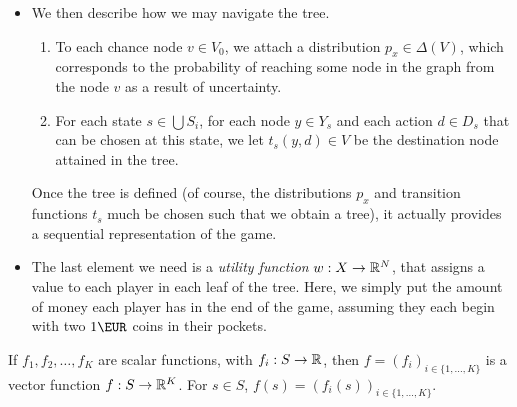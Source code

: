\begin{example}
\begin{itemize}
\item We then describe how we may navigate the tree.
\begin{enumerate}
\item To each chance node $v \in V_0$, we attach a distribution $p_x \in \Delta(V)$, which corresponds to the probability of reaching some node in the graph from the node $v$ as a result of uncertainty.
\item For each state $s \in \bigcup S_i$, for each node $y \in Y_s$ and each action $d \in D_s$ that can be chosen at this state, we let $t_s(y,d) \in V$ be the destination node attained in the tree.
\end{enumerate}
Once the tree is defined (of course, the distributions $p_x$ and transition functions $t_s$ much be chosen such that we obtain a tree), it actually provides a sequential representation of the game.
\item The last element we need is a \emph{utility function} $w : X \rightarrow \mathbb{R}^N$, that assigns a value to each player in each leaf of the tree. Here, we simply put the amount of money each player has in the end of the game, assuming they each begin with two $1\EUR$ coins in their pockets.
\end{itemize}
\end{example}





\begin{notation}
If $f_1, f_2, \ldots, f_K$ are scalar functions, with $f_i : S \rightarrow \mathbb{R}$,
then $f = (f_i)_{i \in \{1,\ldots, K\}}$ is a vector function $f : S \rightarrow \mathbb{R}^K$.
For $s  \in S$,
$f(s) = (f_i(s))_{i \in \{1, \ldots, K\}}.$
\end{notation}

